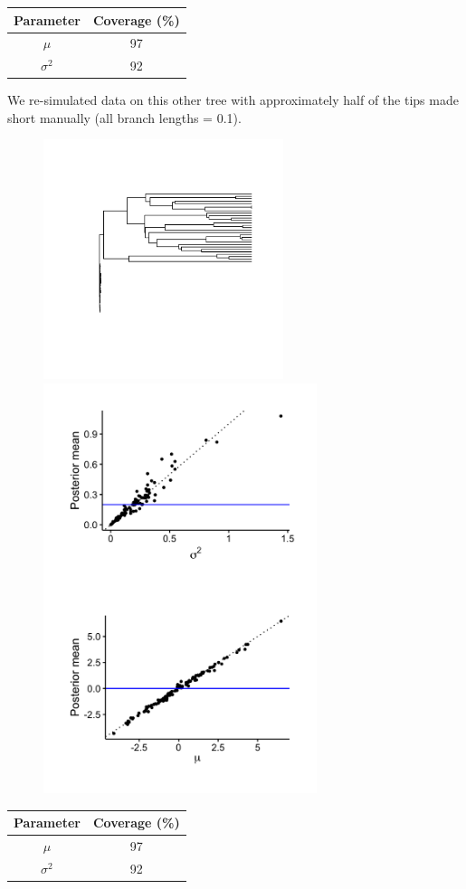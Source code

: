 \documentclass{article}
\begin{document}
\begin{center}
\begin{tabular}{c | c}
    Parameter & Coverage (\%) \\\hline
    $\mu$ & 97\\
    $\sigma^2$ & 92
\end{tabular}
\end{center}

\newpage

\noindent We re-simulated data on this other tree with approximately half of the tips made short manually (all branch lengths = 0.1).

\begin{figure}[!ht]
  \begin{minipage}[c]{.4\textwidth}
    \centering
    \includegraphics[width=7cm]{../BMMVNShiftOneRate_nonultra_tree.png}
  \end{minipage}
  \hfill
  \begin{minipage}{.5\textwidth}
    \centering
    \includegraphics[width=8cm]{../BMMVNShiftOneRate_nonultra_graphs.png}
  \end{minipage}
\end{figure}

\begin{center}
\begin{tabular}{c | c}
    Parameter & Coverage (\%) \\\hline
    $\mu$ & 97\\
    $\sigma^2$ & 92
\end{tabular}
\end{center}
\end{document}
